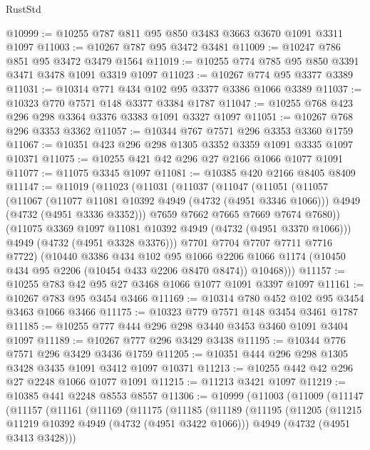 \begin{lexlean}{RustStd}
\begin{coremodule}
{\begin{coremodule}
{{{{{{{{{{{{{{@10999 := @10255 @787 @811 @95 @850 @3483 @3663 @3670 @1091 @3311 @1097
@11003 := @10267 @787 @95 @3472 @3481
@11009 := @10247 @786 @851 @95 @3472 @3479 @1564
@11019 := @10255 @774 @785 @95 @850 @3391 @3471 @3478 @1091 @3319 @1097
@11023 := @10267 @774 @95 @3377 @3389
@11031 := @10314 @771 @434 @102 @95 @3377 @3386 @1066 @3389
@11037 := @10323 @770 @7571 @148 @3377 @3384 @1787
@11047 := @10255 @768 @423 @296 @298 @3364 @3376 @3383 @1091 @3327 @1097
@11051 := @10267 @768 @296 @3353 @3362
@11057 := @10344 @767 @7571 @296 @3353 @3360 @1759
@11067 := @10351 @423 @296 @298 @1305 @3352 @3359 @1091 @3335 @1097 @10371
@11075 := @10255 @421 @42 @296 @27 @2166 @1066 @1077 @1091
@11077 := @11075 @3345 @1097
@11081 := @10385 @420 @2166 @8405 @8409
@11147 := @11019
    (@11023
      (@11031
        (@11037
          (@11047
            (@11051
              (@11057
                (@11067
                  (@11077 @11081 @10392 @4949 (@4732 (@4951 @3346 @1066)))
                  @4949
                  (@4732 (@4951 @3336 @3352)))
                @7659
                @7662
                @7665
                @7669
                @7674
                @7680))
            (@11075 @3369 @1097 @11081 @10392 @4949 (@4732 (@4951 @3370 @1066)))
            @4949
            (@4732 (@4951 @3328 @3376)))
          @7701
          @7704
          @7707
          @7711
          @7716
          @7722)
        (@10440
          @3386
          @434
          @102
          @95
          @1066
          @2206
          @1066
          @1174
          (@10450 @434 @95 @2206 (@10454 @433 @2206 @8470 @8474))
          @10468)))
@11157 := @10255 @783 @42 @95 @27 @3468 @1066 @1077 @1091 @3397 @1097
@11161 := @10267 @783 @95 @3454 @3466
@11169 := @10314 @780 @452 @102 @95 @3454 @3463 @1066 @3466
@11175 := @10323 @779 @7571 @148 @3454 @3461 @1787
@11185 := @10255 @777 @444 @296 @298 @3440 @3453 @3460 @1091 @3404 @1097
@11189 := @10267 @777 @296 @3429 @3438
@11195 := @10344 @776 @7571 @296 @3429 @3436 @1759
@11205 := @10351 @444 @296 @298 @1305 @3428 @3435 @1091 @3412 @1097 @10371
@11213 := @10255 @442 @42 @296 @27 @2248 @1066 @1077 @1091
@11215 := @11213 @3421 @1097
@11219 := @10385 @441 @2248 @8553 @8557
@11306 := @10999
    (@11003
      (@11009
        (@11147
          (@11157
            (@11161
              (@11169
                (@11175
                  (@11185
                    (@11189
                      (@11195
                        (@11205
                          (@11215 @11219 @10392 @4949 (@4732 (@4951 @3422 @1066)))
                          @4949
                          (@4732 (@4951 @3413 @3428)))
}}}}}}}}}}}}}}
\end{coremodule}}
\end{coremodule}
\end{lexlean}
